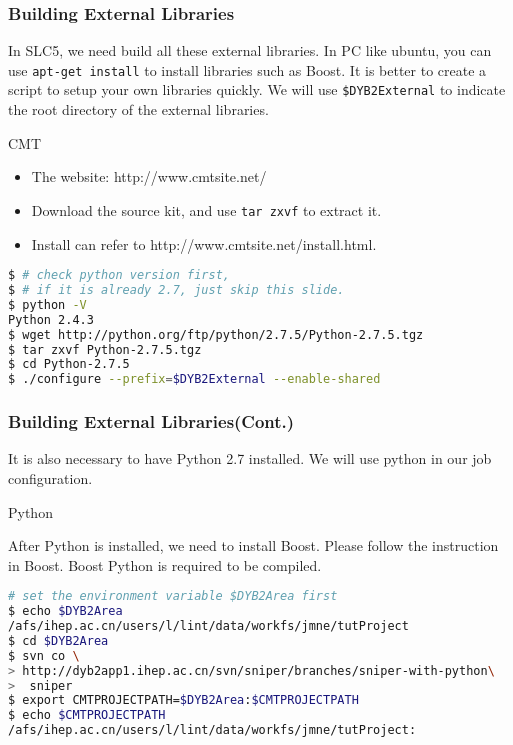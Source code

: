 \begin{frame}
    \frametitle{Building External Libraries}
    In SLC5, we need build all these external libraries.
    In PC like ubuntu, you can use {\tt apt-get install} to install
    libraries such as Boost.
    It is better to create a script to setup your own
    libraries quickly.
    We will use {\tt \$DYB2External} to indicate the root directory
    of the external libraries.
    \begin{block}{CMT}
        \begin{itemize}
            \item The website: http://www.cmtsite.net/
            \item Download the source kit, and use 
                {\tt tar zxvf} to extract it.
            \item Install can refer to 
                http://www.cmtsite.net/install.html.
        \end{itemize}
        \par\usebox{\installcmt}
    \end{block}
\end{frame}

\newsavebox{\installpython}
\begin{lrbox}{\installpython}
\begin{lstlisting}[language=bash]
$ # check python version first, 
$ # if it is already 2.7, just skip this slide.
$ python -V
Python 2.4.3
$ wget http://python.org/ftp/python/2.7.5/Python-2.7.5.tgz
$ tar zxvf Python-2.7.5.tgz 
$ cd Python-2.7.5
$ ./configure --prefix=$DYB2External --enable-shared
\end{lstlisting}
\end{lrbox}

\begin{frame}
    \frametitle{Building External Libraries(Cont.)}
    It is also necessary to have Python 2.7 installed.
    We will use python in our job configuration.

    \begin{block}{Python}
        \par\usebox{\installpython}
    \end{block}

    After Python is installed, we need to install Boost.
    Please follow the instruction in Boost. Boost Python
    is required to be compiled.
\end{frame}

\newsavebox{\getsniper}
\begin{lrbox}{\getsniper}
\begin{lstlisting}[language=bash]
# set the environment variable $DYB2Area first
$ echo $DYB2Area
/afs/ihep.ac.cn/users/l/lint/data/workfs/jmne/tutProject
$ cd $DYB2Area
$ svn co \
> http://dyb2app1.ihep.ac.cn/svn/sniper/branches/sniper-with-python\
>  sniper
$ export CMTPROJECTPATH=$DYB2Area:$CMTPROJECTPATH
$ echo $CMTPROJECTPATH
/afs/ihep.ac.cn/users/l/lint/data/workfs/jmne/tutProject:
\end{lstlisting}
\end{lrbox}


